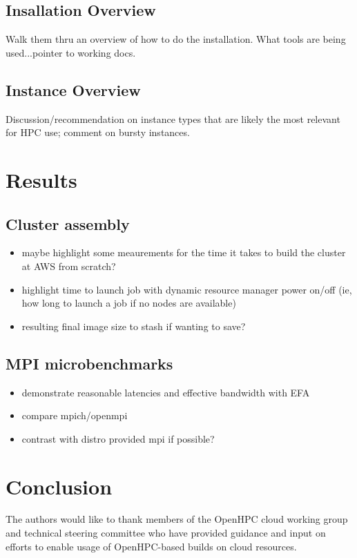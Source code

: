 \documentclass[sigconf,screen]{acmart}
\begin{document}
\subsection{Insallation Overview}
Walk them thru an overview of how to do the installation. What tools are being
used...pointer to working docs.

\subsection{Instance Overview}

Discussion/recommendation on instance types that are likely the most relevant
for HPC use; comment on bursty instances.

\lipsum[4]

\section{Results}
\lipsum[6]
\subsection{Cluster assembly}
\begin{itemize}
\item maybe highlight some meaurements for the time it takes to build the
  cluster at AWS from scratch?
\item highlight time to launch job with dynamic resource manager power on/off
  (ie, how long to launch a job if no nodes are available)
\item resulting final image size to stash if wanting to save?
\end{itemize}

\subsection{MPI microbenchmarks}
\begin {itemize}
\item demonstrate reasonable latencies and effective bandwidth with EFA
\item compare mpich/openmpi
\item contrast with distro provided mpi if possible?
\end{itemize}

\section{Conclusion}
\lipsum[8]

\begin{acks}
The authors would like to thank members of the OpenHPC cloud working group and
technical steering committee who have provided guidance and input on efforts to
enable usage of OpenHPC-based builds on cloud resources.
\end{acks}

\nocite{*}



\end{document}
